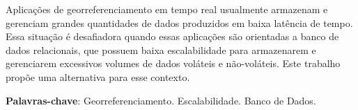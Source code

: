 %
%

\begin{resumo}
	
Aplicações de georreferenciamento em tempo real usualmente armazenam e gerenciam grandes quantidades de dados produzidos em baixa latência de tempo. Essa situação é desafiadora quando essas aplicações são orientadas a banco de dados relacionais, que possuem baixa escalabilidade para armazenarem e gerenciarem excessivos volumes de dados voláteis e não-voláteis. Este trabalho propõe uma alternativa para esse contexto. 	
	
\textbf{Palavras-chave}: Georreferenciamento. Escalabilidade. Banco de Dados.

\end{resumo}
